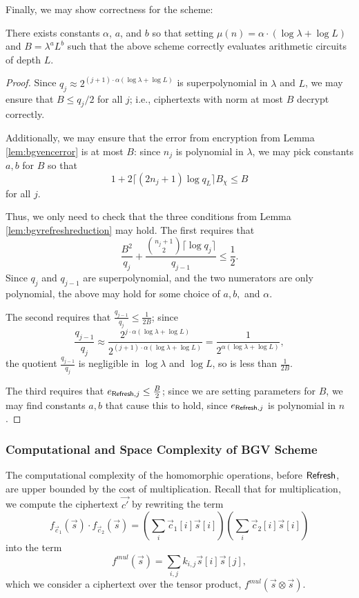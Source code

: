     Finally,  we may show correctness for the scheme:
    \begin{theorem}
        There exists constants $\alpha$, $a$, and $b$ so that setting $\mu(n) = \alpha \cdot (\log \lambda + \log L)$ and $B = \lambda^a L^b$ such that the above scheme correctly evaluates arithmetic circuits of depth $L$.
    \end{theorem}
    \begin{proof}
        Since $q_j \approx 2^{(j+1) \cdot \alpha (\log \lambda + \log L)}$ is superpolynomial in $\lambda$ and $L$, we may ensure that $B \leq q_j / 2$ for all $j$; i.e., ciphertexts with norm at most $B$ decrypt correctly.

        Additionally, we may ensure that the error from encryption from Lemma \ref{lem:bgvencerror} is at most $B$: since $n_j$ is polynomial in $\lambda$, we may pick constants $a,b$ for $B$ so that
        \[1 + 2 \lceil (2n_j + 1) \log q_L \rceil B_\chi \leq B\]
        for all $j$.

        Thus, we only need to check that the three conditions from Lemma \ref{lem:bgvrefreshreduction} may hold. The first requires that
        \[\frac{B^2}{q_j} + \frac{{{n_j + 1}\choose{2}} \lceil \log q_j \rceil}{q_{j-1}} \leq \frac{1}{2}.\]
        Since $q_j$ and $q_{j-1}$ are superpolynomial, and the two numerators are only polynomial, the above may hold for some choice of $a,b,$ and $\alpha$.

        The second requires that $\frac{q_{j-1}}{q_j} \leq \frac{1}{2B}$; since
        \[\frac{q_{j-1}}{q_j} \approx \frac{2^{j \cdot \alpha (\log \lambda + \log L)}}{2^{(j+1) \cdot \alpha (\log \lambda + \log L)}} = \frac{1}{2^{\alpha (\log \lambda + \log L)}},\]
        the quotient $\frac{q_{j-1}}{q_j}$ is negligible in $\log \lambda$ and $\log L$, so is less than $\frac{1}{2B}$.

        The third requires that $e_{{\sf Refresh}, j} \leq \frac{B}{2}$; since we are setting parameters for $B$, we may find constants $a,b$ that cause this to hold, since $e_{{\sf Refresh}, j}$ is polynomial in $n$.

    \end{proof}

    \subsubsection{Computational and Space Complexity of BGV Scheme}


        The computational complexity of the homomorphic operations, before ${\sf Refresh}$, are upper bounded by the cost of multiplication. Recall that for multiplication, we compute the ciphertext $\vec{c'}$ by rewriting the term
        \[f_{\vec{c}_1}(\vec{s}) \cdot f_{\vec{c}_2}(\vec{s}) = (\sum_i \vec{c}_1[i] \vec{s}[i]) (\sum_i \vec{c}_2[i] \vec{s}[i])\]
        into the term
        \[f^{mul}(\vec{s}) = \sum_{i,j} k_{i,j} \vec{s}[i] \vec{s}[j],\]
        which we consider a ciphertext over the tensor product, $f^{mul}(\vec{s} \otimes \vec{s})$.

